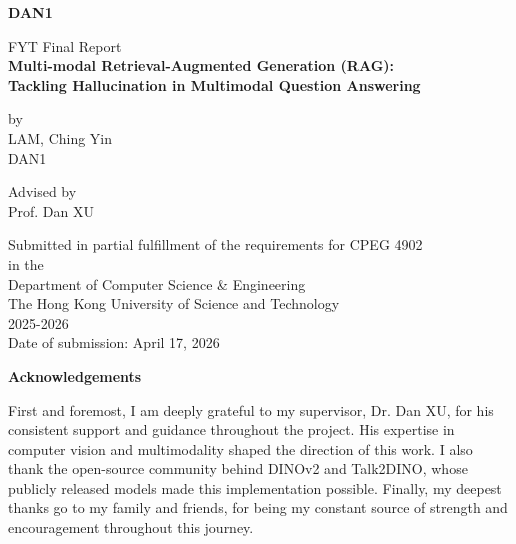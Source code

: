 \documentclass[12pt]{article}
\begin{document}
\pagestyle{empty}
\VerbatimFootnotes

\vspace*{\fill}
\begin{center}
    {\HUGE \textbf{DAN1}}
\end{center}
\vspace*{\fill}
\clearpage

\newpage
\doublespacing
\begin{center}
    {\large FYT Final Report} \\
    \vspace{2mm}
    \textbf{\LARGE Multi-modal Retrieval-Augmented Generation (RAG):} \vspace{2mm}\\
    \textbf{\LARGE Tackling Hallucination in Multimodal Question Answering}

    \vspace{2\baselineskip}

    by \\
    LAM, Ching Yin \\
    DAN1 \\

    \vspace{2\baselineskip}
    
    Advised by \\
    Prof. Dan XU \\

    \vspace{5\baselineskip}

    Submitted in partial fulfillment of the requirements for CPEG 4902 \\
    in the \\
    Department of Computer Science \& Engineering \\
    The Hong Kong University of Science and Technology \\
    2025-2026 \\
    Date of submission: April 17, 2026
\end{center}

\newpage
\begin{center}
    \Large \textbf{Acknowledgements}
\end{center}
First and foremost, I am deeply grateful to my supervisor, Dr. Dan XU, for his consistent support and guidance throughout the project.
His expertise in computer vision and multimodality shaped the direction of this work.
I also thank the open-source community behind DINOv2 and Talk2DINO, whose publicly released models made this implementation possible.
Finally, my deepest thanks go to my family and friends, for being my constant source of strength and encouragement throughout this journey.
\end{document}
